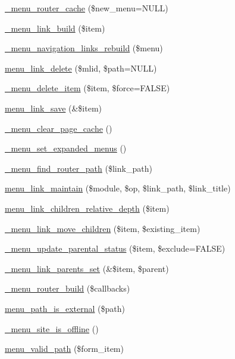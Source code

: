 \begin{CompactItemize}
\item 
\hyperlink{group__menu_g02af3d3800722e9ff5be36485b655905}{\_\-menu\_\-router\_\-cache} (\$new\_\-menu=NULL)
\item 
\hyperlink{group__menu_gdf1f694a2079dcdd6526150eb195915b}{\_\-menu\_\-link\_\-build} (\$item)
\item 
\hyperlink{group__menu_g69fdf86c20d033bc7ba46a14937e20ea}{\_\-menu\_\-navigation\_\-links\_\-rebuild} (\$menu)
\item 
\hyperlink{group__menu_gcb2dddc8ca84476f38a90f4487156b12}{menu\_\-link\_\-delete} (\$mlid, \$path=NULL)
\item 
\hyperlink{group__menu_gf60be5755b46e635c04963e61cdc809a}{\_\-menu\_\-delete\_\-item} (\$item, \$force=FALSE)
\item 
\hyperlink{group__menu_g4fe84fbe31b5a3b6c7fa43e8fe912fb0}{menu\_\-link\_\-save} (\&\$item)
\item 
\hyperlink{group__menu_g6b3bf9ba8f43f983382911beb62ffba0}{\_\-menu\_\-clear\_\-page\_\-cache} ()
\item 
\hyperlink{group__menu_g08212e3890c64045fcf6b44032b343a0}{\_\-menu\_\-set\_\-expanded\_\-menus} ()
\item 
\hyperlink{group__menu_g0842f6b9cf84f5e5ff159159063a78dd}{\_\-menu\_\-find\_\-router\_\-path} (\$link\_\-path)
\item 
\hyperlink{group__menu_ge3248649fb437dedad940df74fb129dc}{menu\_\-link\_\-maintain} (\$module, \$op, \$link\_\-path, \$link\_\-title)
\item 
\hyperlink{group__menu_g75c0660b49841423d8d3c8908e9023fc}{menu\_\-link\_\-children\_\-relative\_\-depth} (\$item)
\item 
\hyperlink{group__menu_geb7542558d6fab7c79b96c1188ee6d67}{\_\-menu\_\-link\_\-move\_\-children} (\$item, \$existing\_\-item)
\item 
\hyperlink{group__menu_g9df6c2183ab9ee0e934eec54a67761d8}{\_\-menu\_\-update\_\-parental\_\-status} (\$item, \$exclude=FALSE)
\item 
\hyperlink{group__menu_g67ab71fff6e17ce3c32752c3bfa00d96}{\_\-menu\_\-link\_\-parents\_\-set} (\&\$item, \$parent)
\item 
\hyperlink{group__menu_g662b13ca71a8b780c9a3b372b25492c3}{\_\-menu\_\-router\_\-build} (\$callbacks)
\item 
\hyperlink{group__menu_gd025fe7dfd80513f2f7baaa66519c508}{menu\_\-path\_\-is\_\-external} (\$path)
\item 
\hyperlink{group__menu_g9ec5f4bcbe8cb76396c1fa9dbbecae5a}{\_\-menu\_\-site\_\-is\_\-offline} ()
\item 
\hyperlink{group__menu_g69ff205e60d5766a074c254060e07456}{menu\_\-valid\_\-path} (\$form\_\-item)
\end{CompactItemize}

